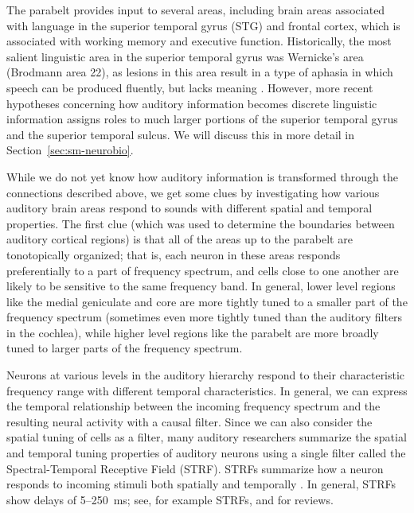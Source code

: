 The parabelt provides input
to several areas,
including brain areas
associated with language
in the superior temporal gyrus (STG)
and frontal cortex,
which is associated
with working memory and executive function.
Historically, the most
salient linguistic area
in the superior temporal gyrus
was Wernicke's area (Brodmann area 22),
as lesions in this area result in
a type of aphasia in which
speech can be produced fluently,
but lacks meaning
\cite{ellis1983}.
However, more recent hypotheses
concerning how auditory information
becomes discrete linguistic information
assigns roles to much larger portions
of the superior temporal gyrus
and the superior temporal sulcus.
We will discuss this in more detail
in Section~\ref{sec:sm-neurobio}.

While we do not yet know how auditory information
is transformed through the connections
described above,
we get some clues by investigating
how various auditory brain areas
respond to sounds with different
spatial and temporal properties.
The first clue
(which was used to determine the boundaries
between auditory cortical regions)
is that all of the areas
up to the parabelt are
tonotopically organized;
that is, each neuron in these areas
responds preferentially to
a part of frequency spectrum,
and cells close to one another
are likely to be sensitive
to the same frequency band.
In general, lower level regions
like the medial geniculate and core
are more tightly tuned
to a smaller part of the frequency spectrum
(sometimes even more tightly tuned
than the auditory filters in the cochlea),
while higher level regions
like the parabelt
are more broadly tuned
to larger parts of the frequency spectrum.

Neurons at various levels in the auditory hierarchy
respond to their characteristic frequency range
with different temporal characteristics.
In general, we can express the temporal
relationship between the incoming
frequency spectrum and the resulting
neural activity with a causal filter.
Since we can also consider
the spatial tuning of cells as a filter,
many auditory researchers
summarize the spatial and temporal
tuning properties of auditory neurons
using a single filter
called the
Spectral-Temporal Receptive Field (STRF).
STRFs summarize how a neuron responds
to incoming stimuli both spatially
and temporally \citep{aertsen1981}.
In general, STRFs
show delays of 5--250~ms;
see, \citet[Supplementary material]{mesgarani2014}
for example STRFs,
and \citet{kaas1999,kaas2000,scott2003,semple2003}
for reviews.

